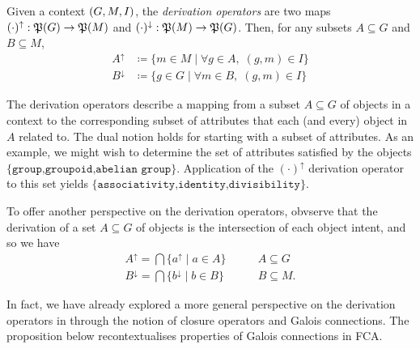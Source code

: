 \begin{definition}
   \label{definition:derivation-operators} Given a context $(G,M,\mathrel{I})$, the \textit{derivation operators} are two maps $(\cdot)^{\uparrow}: \mathfrak{P}({G})\to \mathfrak{P}({M})$ and $(\cdot )^{\downarrow}
  : \mathfrak{P}({M})\to \mathfrak{P}({G})$. Then, for any subsets $A \subseteq G$ and $B \subseteq M$,
  \begin{align*}
    A^{\uparrow}   & \coloneqq \{m \in M \mid \forall g \in A, \; (g,m) \in I\} \\
    B^{\downarrow} & \coloneqq \{g \in G \mid \forall m \in B, \; (g,m) \in I\}
  \end{align*}
\end{definition}

The derivation operators describe a mapping from a subset $A \subseteq G$ of objects in a context to the corresponding subset of attributes that each (and every) object in $A$ related to. The dual notion
holds for starting with a subset of attributes. As an example, we might wish to determine the set of attributes satisfied by the objects $\{\texttt{group,groupoid,abelian group}\}$. Application of the
$(\cdot)^{\uparrow}$ derivation operator to this set yields $\{\texttt{associativity,identity,divisibility}\}$.

To offer another perspective on the derivation operators, obvserve that the derivation of a set $A\subseteq G$ of objects is the intersection of each object intent, and so we have
\begin{align*}
  A^{\uparrow}= \bigcap \{a^{\uparrow}\mid a \in A\}     & \qquad A \subseteq G  \\
  B^{\downarrow}= \bigcap \{b^{\downarrow}\mid b \in B\} & \qquad B \subseteq M.
\end{align*}

In fact, we have already explored a more general perspective on the derivation operators in  through the notion of closure operators and Galois connections. The proposition
below recontextualises properties of Galois connections in FCA.

